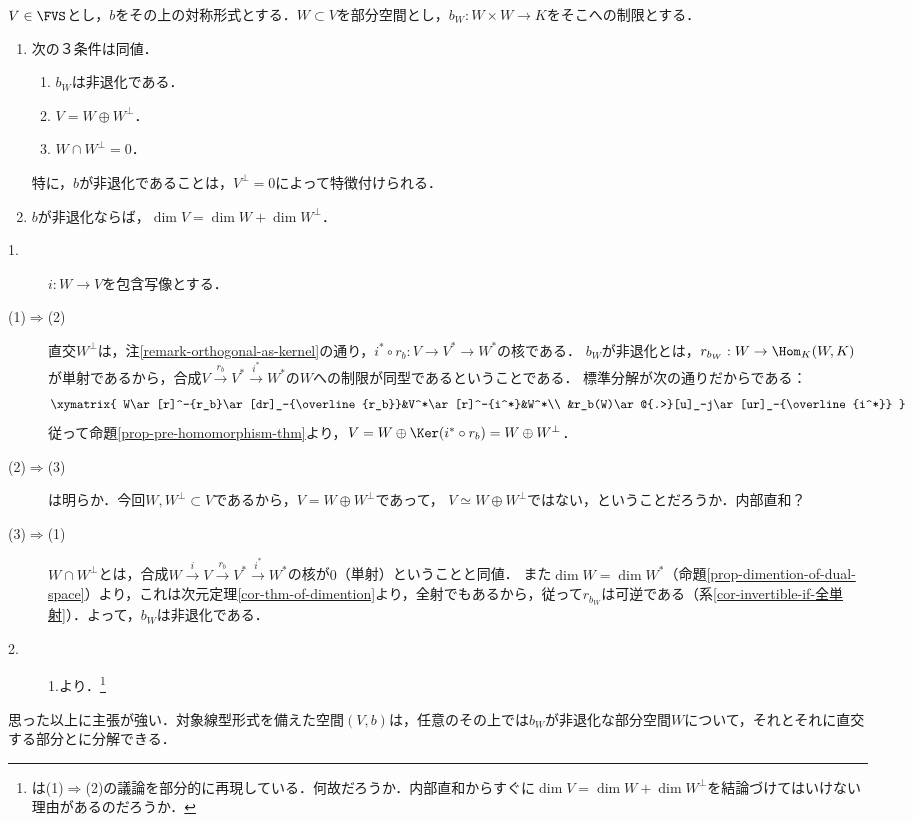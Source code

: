 \documentclass[uplatex, dvipdfmx]{jsreport}
\begin{document}
\begin{proposition}[直交が補空間を与えることは非退化であることに同値]\label{prop-decomposition-along-orthogonal-space}
    $V\in\FVS$とし，$b$をその上の対称形式とする．$W\subset V$を部分空間とし，$b_W:W\times W\to K$をそこへの制限とする．
    \begin{enumerate}
        \item 次の３条件は同値．
        \begin{enumerate}[(1)]
            \item $b_W$は非退化である．
            \item $V=W\oplus W^\perp$．
            \item $W\cap W^\perp=0$．
        \end{enumerate}
        特に，$b$が非退化であることは，$V^\perp=0$によって特徴付けられる．
        \item $b$が非退化ならば，$\dim V=\dim W+\dim W^\perp$．
    \end{enumerate}
\end{proposition}
\begin{Proof}\mbox{}
    \begin{description}
        \item[1.] $i:W\to V$を包含写像とする．
        \item[(1)$\Rightarrow$(2)]
        直交$W^\perp$は，注\ref{remark-orthogonal-as-kernel}の通り，$i^*\circ r_b:V\to V^*\to W^*$の核である．
        $b_W$が非退化とは，$r_{b_W}:W\to\Hom_K(W,K)$が単射であるから，合成$V\xrightarrow{r_b}V^*\xrightarrow{i^*}W^*$の$W$への制限が同型であるということである．
        標準分解が次の通りだからである：
        \[\xymatrix{
            W\ar[r]^-{r_b}\ar[dr]_-{\overline{r_b}}&V^*\ar[r]^-{i^*}&W^*\\
            &r_b(W)\ar@{.>}[u]_-j\ar[ur]_-{\overline{i^*}}
        }\]
        従って命題\ref{prop-pre-homomorphism-thm}より，$V=W\oplus\Ker (i^*\circ r_b)=W\oplus W^\perp$．
        \item[(2)$\Rightarrow$(3)] は明らか．今回$W,W^\perp\subset V$であるから，$V=W\oplus W^\perp$であって， $V\simeq W\oplus W^\perp$ではない，ということだろうか．内部直和？
        \item[(3)$\Rightarrow$(1)] $W\cap W^\perp$とは，合成$W\xrightarrow{i} V\xrightarrow{r_b}V^*\xrightarrow{i^*}W^*$の核が$0$（単射）ということと同値．
        また$\dim W=\dim W^*$（命題\ref{prop-dimention-of-dual-space}）より，これは次元定理\ref{cor-thm-of-dimention}より，全射でもあるから，従って$r_{b_W}$は可逆である（系\ref{cor-invertible-if-全単射}）．よって，$b_W$は非退化である．
        \item[2.]
        1.より．\footnote{\cite{斎藤毅-線型代数}は(1)$\Rightarrow$(2)の議論を部分的に再現している．何故だろうか．内部直和からすぐに$\dim V=\dim W+\dim W^\perp$を結論づけてはいけない理由があるのだろうか．}
    \end{description}
\end{Proof}
\begin{remarks}
    思った以上に主張が強い．対象線型形式を備えた空間$(V,b)$は，任意のその上では$b_W$が非退化な部分空間$W$について，それとそれに直交する部分とに分解できる．
\end{remarks}
\end{document}
